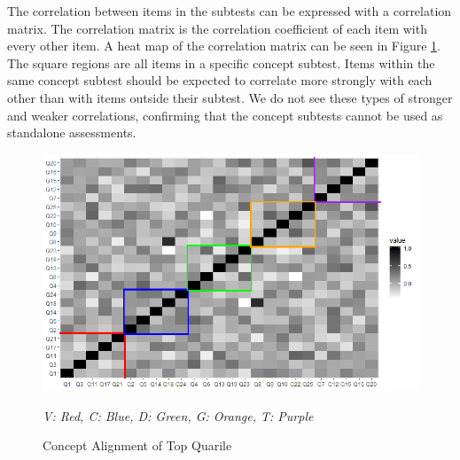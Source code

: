 
\begin{table}[!htbp]
\caption{Cronbach's $\alpha$ by Concept}
\centering
{}
\label{tab:alpha_concept}
\end{table}


\iflong

The correlation between items in the subtests can be expressed with a correlation matrix. The correlation matrix is the correlation coefficient of each item with every other item. A heat map of the correlation matrix can be seen in Figure \ref{fig:alignment}. The square regions are all items in a specific concept subtest. Items within the same concept subtest should be expected to correlate  more strongly with each other than with items outside their subtest. We do not see these types of stronger and weaker correlations, confirming that the concept subtests cannot be used as standalone assessments.

\begin{figure}[!hbp]
    \centering
    \includegraphics[scale=.35]{images/heat_map_top_quarter.png}
    \begin{minipage}{0.65\linewidth}
    \tiny
    \emph{
    V: Red,
    C: Blue,
    D: Green,
    G: Orange,
    T: Purple
    }
    \end{minipage}
    \caption{Concept Alignment of Top Quarile}
    \label{fig:alignment}
\end{figure}
\fi

